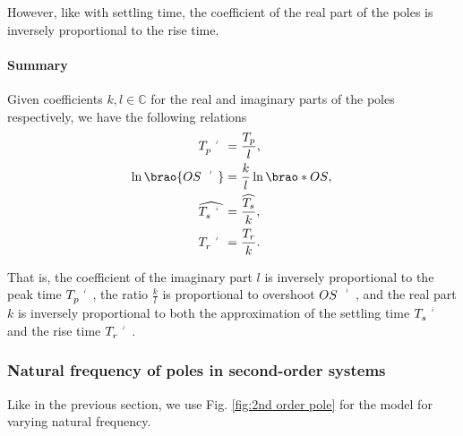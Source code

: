 \documentclass[11pt]{article}
\begin{document}
\begin{adjustwidth}{0.5in}{0in}
        However, like with settling time,
        the coefficient of the real part of the poles is inversely proportional to the rise time.

        \paragraph{Summary}
        Given coefficients \(k, l \in \mathbb{C}\)
        for the real and imaginary parts of the poles respectively,
        we have the following relations
        \begin{eqnarray}
            \llap{\(
                \setprime{T}_p
            \)} = \rlap{\(
                \dfrac{T_p}l,
            \)}
        \\*
            \llap{\(
                \ln\brao{\setprime{OS}}
            \)} = \rlap{\(
                \dfrac{k}l\ln\brao*{OS},
            \)}
        \\*
            \llap{\(
                \widehat{\setprime{T}_s}
            \)} = \rlap{\(
                \dfrac{\widehat{T_s}}k,
            \)}
        \\*
            \llap{\(
                \setprime{T}_r
            \)} = \rlap{\(
                \dfrac{T_r}k.
            \)}
        \end{eqnarray}

        That is, the coefficient of the imaginary part \(l\) is inversely proportional to the peak time \(\setprime{T}_p\),
        the ratio \(\frac{k}l\) is proportional to overshoot \(\setprime{OS}\),
        and the real part \(k\) is inversely proportional to both
        the approximation of the settling time \(\setprime{T}_s\)
        and the rise time \(\setprime{T}_r\).

        \subsubsection{Natural frequency of poles in second-order systems}

        Like in the previous section,
        we use Fig. \ref{fig:2nd order pole}
        for the model for varying natural frequency.


\end{adjustwidth}
\end{document}
